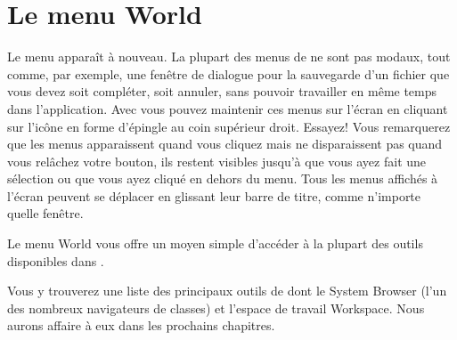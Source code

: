 \documentclass[a4paper,10pt,twoside]{book}
\begin{document}
\section{Le menu World}

Le menu  apparaît à nouveau.
La plupart des menus de \sq ne sont pas modaux, tout comme, par
exemple, une fenêtre de dialogue pour la sauvegarde d'un fichier que
vous devez soit compléter, soit annuler, sans pouvoir travailler en même temps dans l'application. 
Avec \sq vous pouvez maintenir ces menus sur l'écran en cliquant sur
l'icône en forme d'épingle au coin supérieur droit. Essayez! Vous
remarquerez que les menus apparaissent  quand  vous cliquez  mais ne
disparaissent pas quand vous relâchez votre bouton, ils restent
visibles jusqu'à que vous ayez fait une sélection ou que vous ayez
cliqué en dehors du menu. Tous les menus affichés à l'écran peuvent se déplacer en glissant leur barre de titre, comme n'importe quelle fenêtre.

Le menu World vous offre un moyen simple d'accéder à la plupart des
outils disponibles dans \sq.

Vous y trouverez une liste des principaux outils de \sq dont le System Browser (l'un
des nombreux navigateurs de classes) et l'espace de travail
Workspace. Nous aurons affaire à eux dans les prochains chapitres.
\end{document}
